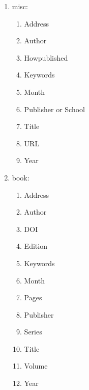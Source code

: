 \documentclass[letter,12pt]{article}
\begin{document}
\begin{enumerate}
	\begin{enumerate} \itemsep -2pt
	\item Address
	\item Author
	\item DOI (there are multiple research universities that assign DOIs to Ph.D. dissertations, and possibly Masters theses)
	\item Howpublished
	\item Keywords
	\item Month
	\item Number: \vspace{-0.2cm}
		\begin{enumerate} \itemsep -2pt
		\item Some {\sc Bib}\TeX\ bibliography styles don't indicate the number, or show the number but hide some other important information.
		\item Hence, if the number is important include it in the Annote field.
		\end{enumerate}
	\item School
	\item Title
	\item URL
	\item Year
	\item Annote
	\end{enumerate}
\item misc: \vspace{-0.3cm}
	\begin{enumerate} \itemsep -2pt
	\item Address
	\item Author
	\item Howpublished
	\item Keywords
	\item Month
	\item Publisher or School
	\item Title
	\item URL
	\item Year
	\end{enumerate}
\item book: \vspace{-0.3cm}
	\begin{enumerate} \itemsep -2pt
	\item Address
	\item Author
	\item DOI
	\item Edition
	\item Keywords
	\item Month
	\item Pages
	\item Publisher
	\item Series
	\item Title
	\item Volume
	\item Year
	\end{enumerate}
\end{enumerate}
\end{document}
